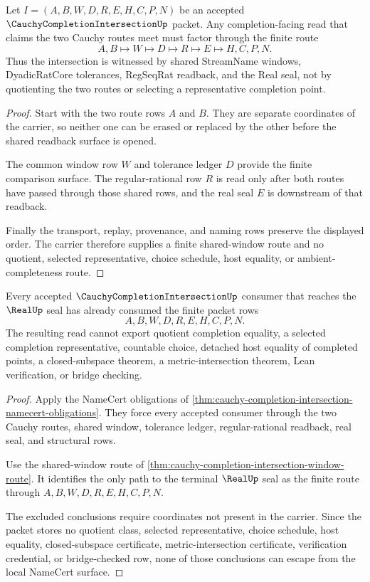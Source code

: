 \begin{theorem}
\label{thm:cauchy-completion-intersection-window-route}
Let $I=(A,B,W,D,R,E,H,C,P,N)$ be an accepted $\CauchyCompletionIntersectionUp$ packet. Any completion-facing read that claims the two Cauchy routes meet must factor through the finite route
$$
A,B\longmapsto W\longmapsto D\longmapsto R\longmapsto E\longmapsto H,C,P,N .
$$
Thus the intersection is witnessed by shared StreamName windows, DyadicRatCore tolerances, RegSeqRat readback, and the Real seal, not by quotienting the two routes or selecting a representative completion point.
\end{theorem}
\begin{proof}
Start with the two route rows $A$ and $B$. They are separate coordinates of the carrier, so neither one can be erased or replaced by the other before the shared readback surface is opened.

The common window row $W$ and tolerance ledger $D$ provide the finite comparison surface. The regular-rational row $R$ is read only after both routes have passed through those shared rows, and the real seal $E$ is downstream of that readback.

Finally the transport, replay, provenance, and naming rows preserve the displayed order. The carrier therefore supplies a finite shared-window route and no quotient, selected representative, choice schedule, host equality, or ambient-completeness route.
\end{proof}

\begin{theorem}
\label{thm:cauchy-completion-intersection-nonescape}
Every accepted $\CauchyCompletionIntersectionUp$ consumer that reaches the $\RealUp$ seal has already consumed the finite packet rows
$$
A,B,W,D,R,E,H,C,P,N .
$$
The resulting read cannot export quotient completion equality, a selected completion representative, countable choice, detached host equality of completed points, a closed-subspace theorem, a metric-intersection theorem, Lean verification, or bridge checking.
\end{theorem}
\begin{proof}
Apply the NameCert obligations of \autoref{thm:cauchy-completion-intersection-namecert-obligations}. They force every accepted consumer through the two Cauchy routes, shared window, tolerance ledger, regular-rational readback, real seal, and structural rows.

Use the shared-window route of \autoref{thm:cauchy-completion-intersection-window-route}. It identifies the only path to the terminal $\RealUp$ seal as the finite route through $A,B,W,D,R,E,H,C,P,N$.

The excluded conclusions require coordinates not present in the carrier. Since the packet stores no quotient class, selected representative, choice schedule, host equality, closed-subspace certificate, metric-intersection certificate, verification credential, or bridge-checked row, none of those conclusions can escape from the local NameCert surface.
\end{proof}

